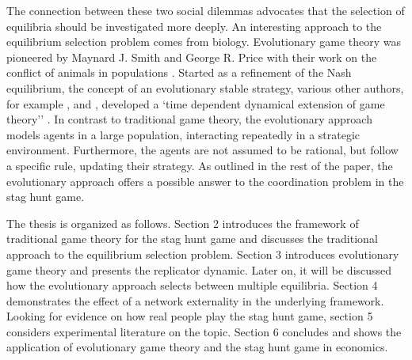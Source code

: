 The connection between these two social dilemmas advocates that
the selection of equilibria should be investigated more deeply. 
An interesting approach to the equilibrium selection problem comes from
biology. Evolutionary game theory was pioneered by Maynard J. Smith and George
R. Price with their work on the conflict of animals in populations 
\parencite{smith_lhe_1973}. Started as a refinement of the Nash equilibrium,
the concept of an evolutionary stable strategy, various other authors, for 
example \textcite{taylor_evolutionary_1978}, \textcite{hofbauer_note_1979} and
\textcite{zeeman_dynamics_1981}, developed a `time dependent dynamical
extension of game theory'' \parencite[55]{hanauske_evolutionare_2011}.
In contrast to traditional game theory, the evolutionary approach  models
 agents in a large population, interacting repeatedly in a strategic environment. 
Furthermore, the agents are not assumed to be rational, but follow a specific 
rule, updating their strategy. 
As outlined in the rest of the paper, the
evolutionary approach offers a possible answer to the coordination
problem in the stag hunt game.

The thesis is organized as follows. Section 2 introduces the 
framework of traditional game theory for the stag hunt game and discusses
the traditional approach to the equilibrium selection problem. Section 3
introduces evolutionary game theory and presents the replicator dynamic. 
Later on, it will be discussed how the evolutionary approach selects
between multiple equilibria. Section 4 demonstrates the effect of a
network externality in the underlying framework. Looking for evidence on
how real people play the stag hunt game, section 5 considers experimental
literature on the topic. Section 6 concludes and shows the application of
evolutionary game theory and the stag hunt game in economics.

